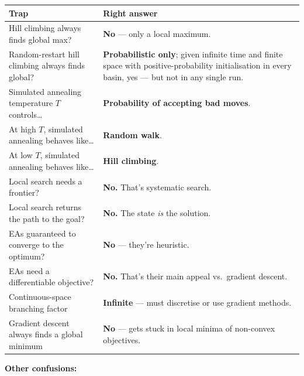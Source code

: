 \documentclass[11pt, a4paper]{article}
\newcommand{\thead}[1]{\textbf{#1}}
\begin{document}
\begin{trapbox}[summary]
\begin{tabular}{@{}p{6.5cm}p{8cm}@{}}
\toprule
\thead{Trap} & \thead{Right answer} \\
\midrule
Hill climbing always finds global max?            & \textbf{No} — only a local maximum. \\
Random-restart hill climbing always finds global? & \textbf{Probabilistic only}; given infinite time and finite space with positive-probability initialisation in every basin, yes — but not in any single run. \\
Simulated annealing temperature $T$ controls\dots & \textbf{Probability of accepting bad moves}. \\
At high $T$, simulated annealing behaves like\dots & \textbf{Random walk}. \\
At low $T$, simulated annealing behaves like\dots  & \textbf{Hill climbing}. \\
Local search needs a frontier?                    & \textbf{No.} That's systematic search. \\
Local search returns the path to the goal?        & \textbf{No.} The state \emph{is} the solution. \\
EAs guaranteed to converge to the optimum?        & \textbf{No} — they're heuristic. \\
EAs need a differentiable objective?              & \textbf{No.} That's their main appeal vs.\ gradient descent. \\
Continuous-space branching factor                 & \textbf{Infinite} — must discretise or use gradient methods. \\
Gradient descent always finds a global minimum    & \textbf{No} — gets stuck in local minima of non-convex objectives. \\
\bottomrule
\end{tabular}
\end{trapbox}

\textbf{Other confusions:}
\end{document}
